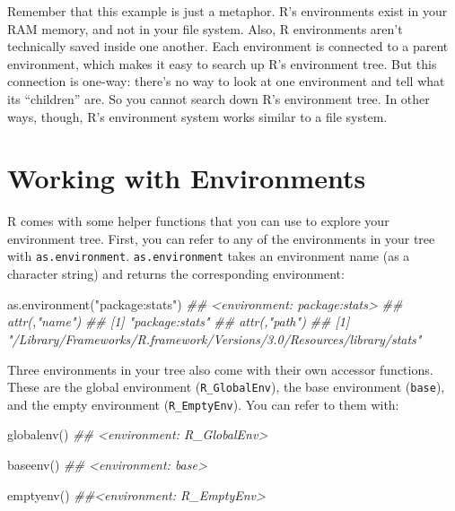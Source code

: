 \documentclass[
  letterpaper,
  DIV=11,
  numbers=noendperiod]{scrbook}
\newenvironment{Shaded}{\begin{snugshade}}{\end{snugshade}}
\newcommand{\DocumentationTok}[1]{\textcolor[rgb]{0.37,0.37,0.37}{\textit{#1}}}
\newcommand{\FunctionTok}[1]{\textcolor[rgb]{0.28,0.35,0.67}{#1}}
\newcommand{\NormalTok}[1]{\textcolor[rgb]{0.00,0.23,0.31}{#1}}
\newcommand{\StringTok}[1]{\textcolor[rgb]{0.13,0.47,0.30}{#1}}
\begin{document}
Remember that this example is just a metaphor. R's environments exist in
your RAM memory, and not in your file system. Also, R environments
aren't technically saved inside one another. Each environment is
connected to a parent environment, which makes it easy to search up R's
environment tree. But this connection is one-way: there's no way to look
at one environment and tell what its ``children'' are. So you cannot
search down R's environment tree. In other ways, though, R's environment
system works similar to a file system.

\section{Working with Environments}\label{working-with-environments}

R comes with some helper functions that you can use to explore your
environment tree. First, you can refer to any of the environments in
your tree with \texttt{as.environment}. \texttt{as.environment} takes an
environment name (as a character string) and returns the corresponding
environment:

\begin{Shaded}
\begin{Highlighting}[]
\FunctionTok{as.environment}\NormalTok{(}\StringTok{"package:stats"}\NormalTok{)}
\DocumentationTok{\#\# \textless{}environment: package:stats\textgreater{}}
\DocumentationTok{\#\# attr(,"name")}
\DocumentationTok{\#\# [1] "package:stats"}
\DocumentationTok{\#\# attr(,"path")}
\DocumentationTok{\#\# [1] "/Library/Frameworks/R.framework/Versions/3.0/Resources/library/stats"}
\end{Highlighting}
\end{Shaded}

Three environments in your tree also come with their own accessor
functions. These are the global environment (\texttt{R\_GlobalEnv}), the
base environment (\texttt{base}), and the empty environment
(\texttt{R\_EmptyEnv}). You can refer to them with:

\begin{Shaded}
\begin{Highlighting}[]
\FunctionTok{globalenv}\NormalTok{()}
\DocumentationTok{\#\# \textless{}environment: R\_GlobalEnv\textgreater{}}

\FunctionTok{baseenv}\NormalTok{()}
\DocumentationTok{\#\# \textless{}environment: base\textgreater{}}

\FunctionTok{emptyenv}\NormalTok{()}
\DocumentationTok{\#\#\textless{}environment: R\_EmptyEnv\textgreater{}}
\end{Highlighting}
\end{Shaded}
\end{document}

